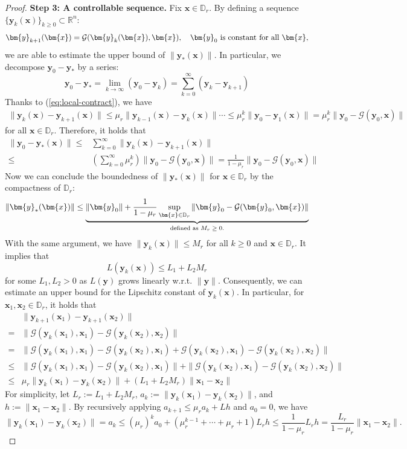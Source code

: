 \documentclass{amsart} %
\def\eqref#1{equation~\ref{#1}}
\def\vx{{\bm{x}}}
\def\vy{{\bm{y}}}
\def\sD{{\mathbb{D}}}
\def\sR{{\mathbb{R}}}
\def\cG{{\mathcal{G}}}
\theoremstyle{definition}
\theoremstyle{remark}
\renewcommand{\eqref}[1]{\textup{(\ref{#1})}}
\begin{document}
\begin{proof}
\textbf{Step 3: A controllable sequence.} Fix $\vx \in \sD_r$.
By defining a sequence $\{\vy_k(\vx)\}_{k \geq 0} \subset \sR^n$:
\[ \vy_{k+1}(\vx) = \cG(\vy_{k}(\vx),\vx), \quad \vy_0 \textup{ is constant for all }\vx, \]
we are able to estimate the upper bound of $\|\vy_\ast(\vx)\|$. In particular, we decompose $\vy_0 - \vy_\ast$ by a series:
\[ \vy_0 - \vy_\ast = \lim_{k \to \infty} (\vy_0 - \vy_k) = \sum_{k=0}^{\infty} (\vy_k - \vy_{k+1}) \]
Thanks to \eqref{eq:local-contract}, we have
\begin{align*}
\|\vy_k(\vx) - \vy_{k+1}(\vx)\| \leq \mu_r \|\vy_{k-1}(\vx) - \vy_{k}(\vx)\| \cdots \leq \mu_r^k \|\vy_0 - \vy_{1}(\vx)\| = \mu_r^k \|\vy_0 - \cG(\vy_0,\vx)\|
\end{align*}
for all $\vx \in \sD_r$. Therefore, it holds that
\begin{align*}
\|\vy_0 - \vy_\ast(\vx)\|
\leq& \sum_{k=0}^{\infty} \|\vy_k(\vx) - \vy_{k+1}(\vx)\| \\
\leq& \left(\sum_{k=0}^{\infty} \mu_r^k \right) \|\vy_0 - \cG(\vy_0,\vx)\| 
= \frac{1}{1-\mu_r} \|\vy_0 - \cG(\vy_0,\vx)\|
\end{align*}
Now we can conclude the boundedness of $\|\vy_\ast(\vx)\|$ for $\vx \in \sD_r$ by the compactness of $\sD_r$:
\[ \|\vy_\ast(\vx)\| \leq \underbrace{\|\vy_0\| + \frac{1}{1-\mu_r} \sup_{\vx \in \sD_r}\|\vy_0 - \cG(\vy_0,\vx)\|}_{\textup{defined as $M_r \geq 0$.}}  \]
With the same argument, we have $\|\vy_k(\vx)\| \leq M_r$ for all $k \geq 0$ and $\vx \in \sD_r$. It implies that 
\[ L(\vy_k(\vx)) \leq L_1 + L_2 M_r \] 
for some $L_1,L_2>0$ as $L(\vy)$ grows linearly w.r.t. $\|\vy\|$. 
Consequently, we can estimate an upper bound for the Lipschitz constant of $\vy_k(\vx)$. In particular, for $\vx_1,\vx_2 \in \sD_r$, it holds that
\begin{align*}
& \| \vy_{k+1}(\vx_1) - \vy_{k+1}(\vx_2) \|\\
= & \| \cG(\vy_{k}(\vx_1),\vx_1) - \cG(\vy_{k}(\vx_2),\vx_2) \| \\
= & \| \cG(\vy_{k}(\vx_1),\vx_1) - \cG(\vy_{k}(\vx_2),\vx_1) + \cG(\vy_{k}(\vx_2),\vx_1) - \cG(\vy_{k}(\vx_2),\vx_2) \| \\
\leq & \| \cG(\vy_{k}(\vx_1),\vx_1) - \cG(\vy_{k}(\vx_2),\vx_1)\| + \| \cG(\vy_{k}(\vx_2),\vx_1) - \cG(\vy_{k}(\vx_2),\vx_2) \|\\
\leq & \mu_r \| \vy_{k}(\vx_1) - \vy_{k}(\vx_2)\| + (L_1 + L_2 M_r) \| \vx_1 - \vx_2 \|
\end{align*}
For simplicity, let $L_r:=L_1 + L_2 M_r$, $a_k := \| \vy_{k}(\vx_1) - \vy_{k}(\vx_2)\|$, and $h := \| \vx_1 - \vx_2 \|$. By recursively applying $a_{k+1} \leq \mu_r a_{k} + Lh$ and $a_0 = 0$, we have
\[ \| \vy_{k}(\vx_1) - \vy_{k}(\vx_2)\| = a_k \leq (\mu_r)^k a_0 + (\mu_r^{k-1} + \cdots + \mu_r + 1)L_r h \leq \frac{1}{1-\mu_r}L_r h = \frac{L_r}{1-\mu_r} \| \vx_1 - \vx_2 \|.\]


\end{proof}
\end{document}
